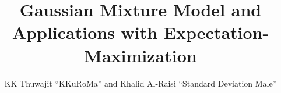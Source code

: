 \documentclass{article}
\title{Gaussian Mixture Model and Applications with Expectation-Maximization}
\author{KK Thuwajit ``KKuRoMa'' and Khalid Al-Raisi ``Standard Deviation Male''}
\begin{document}
\newtheorem{theorem}{Theorem}
\newtheorem{lemma}{Lemma}
\theoremstyle{definition}
\newtheorem{definition}{Definition}
\newtheorem{example}{Example}
\maketitle
\tableofcontents
\newpage









\end{document}
